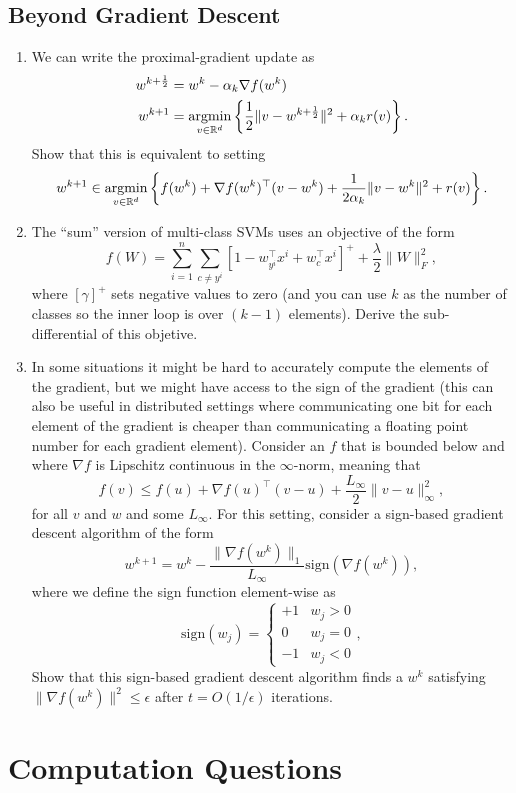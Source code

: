 \documentclass{article}
\def\blu#1{{\color{blu}#1}}
\def\red#1{{\color{red}#1}}
\def\norm#1{\|#1\|}
\def\R{\mathbb{R}}
\newcommand{\argmin}[1]{\mathop{\hbox{argmin}}_{#1}}
\def\half{\frac 1 2}
\def\enum#1{\begin{enumerate}#1\end{enumerate}}
\begin{document}
\subsection{Beyond Gradient Descent}


\enum{
\item We can write the proximal-gradient update as
\begin{align*}
w^{k+\half} & = w^k - \alpha_k \nabla f(w^k)\\
w^{k+1} &= \argmin{v\in\R^d}\left\{\frac{1}{2}\norm{v -w^{k+\half}}^2 + \alpha_kr(v)\right\}.
\end{align*}
\blu{Show that this is equivalent to setting
\[
w^{k+1} \in \argmin{v\in\R^d} \left\{ f(w^k) + \nabla f(w^k)^\top (v-w^k) + \frac{1}{2\alpha_k}\norm{v-w^k}^2  +r(v)\right\}.
\]
}
\item The ``sum'' version of multi-class SVMs uses an objective of the form
\[
f(W) = \sum_{i=1}^n \sum_{c \neq y^i}[1 - w_{y^i}^\top x^i + w_c^\top x^i]^+ + \frac \lambda 2 \norm{W}_F^2,
\]
where $[\gamma]^+$ sets negative values to zero (and you can use $k$ as the number of classes so the inner loop is over $(k-1)$ elements). \blu{Derive the sub-differential of this objetive}.
\item In some situations it might be hard to accurately compute the elements of the gradient, but we might have access to the sign of the gradient (this can also be useful in distributed settings where communicating one bit for each element of the gradient is cheaper than communicating a floating point number for each gradient element). 
Consider an $f$ that is bounded below and where $\nabla f$ is Lipschitz continuous in the $\infty$-norm, meaning that
\[
f(v) \leq f(u) + \nabla f(u)^\top (v-u) + \frac{L_\infty}{2}\norm{v-u}_\infty^2,
\]
for all $v$ and $w$ and some $L_\infty$. 
For this setting, consider a sign-based gradient descent algorithm of the form
\[
w^{k+1} = w^k - \frac{\norm{\nabla f(w^k)}_1}{L_\infty}\text{sign}(\nabla f(w^k)),
\]
where we define the sign function element-wise as
\[
\text{sign}(w_j) = \begin{cases}+1 & w_j > 0\\0 & w_j =0\\-1 & w_j < 0\end{cases},
\]
\blu{Show that this sign-based gradient descent algorithm finds a $w^k$ satisfying \red{$\norm{\nabla f(w^k)}^2 \leq \epsilon$} after $t = O(1/\epsilon)$ iterations.}
}


\section{Computation Questions}
\end{document}

